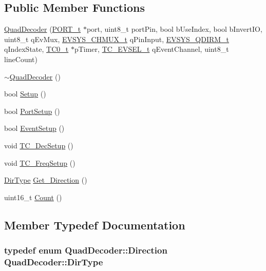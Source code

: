 \subsection*{Public Member Functions}
\begin{DoxyCompactItemize}
\item 
\hyperlink{class_quad_decoder_a38420f3e5c299380a785e26b072669be}{QuadDecoder} (\hyperlink{struct_p_o_r_t__struct}{PORT\_\-t} $\ast$port, uint8\_\-t portPin, bool bUseIndex, bool bInvertIO, uint8\_\-t qEvMux, \hyperlink{iox128a1_8h_a3cd79edc604aba8b0754f91b37ddcba5}{EVSYS\_\-CHMUX\_\-t} qPinInput, \hyperlink{iox128a1_8h_a4cfc797e8e2c93c55602d5d6155052f8}{EVSYS\_\-QDIRM\_\-t} qIndexState, \hyperlink{struct_t_c0__struct}{TC0\_\-t} $\ast$pTimer, \hyperlink{iox128a1_8h_a5bc8c280528ada623244a4d6bdb631f0}{TC\_\-EVSEL\_\-t} qEventChannel, uint8\_\-t lineCount)
\item 
\hyperlink{class_quad_decoder_a3bf8332deb2c5137475afd3a5cf783f4}{$\sim$QuadDecoder} ()
\item 
bool \hyperlink{class_quad_decoder_a105fd8cb67abf552d48f46e6e1642860}{Setup} ()
\item 
bool \hyperlink{class_quad_decoder_a41752ce819b5a24bc34d28eab1a3c624}{PortSetup} ()
\item 
bool \hyperlink{class_quad_decoder_aa1ab195b0d79c999572a2fab78f79f9d}{EventSetup} ()
\item 
void \hyperlink{class_quad_decoder_a91ae5ea8102bca0d130c42b6f9cfdb75}{TC\_\-DecSetup} ()
\item 
void \hyperlink{class_quad_decoder_a3b92eae38be093dcf9929a9f1b227ec0}{TC\_\-FreqSetup} ()
\item 
\hyperlink{class_quad_decoder_a63a55fea541c4a30ebb12bcfa21359a3}{DirType} \hyperlink{class_quad_decoder_af6bef7875cdc7f55e184ca6216453558}{Get\_\-Direction} ()
\item 
uint16\_\-t \hyperlink{class_quad_decoder_a3ac03c7af7b72c82f1519ede462b6a5c}{Count} ()
\end{DoxyCompactItemize}


\subsection{Member Typedef Documentation}
\hypertarget{class_quad_decoder_a63a55fea541c4a30ebb12bcfa21359a3}{
\subsubsection[{DirType}]{\setlength{\rightskip}{0pt plus 5cm}typedef enum {\bf QuadDecoder::Direction}  {\bf QuadDecoder::DirType}}}
\label{class_quad_decoder_a63a55fea541c4a30ebb12bcfa21359a3}


